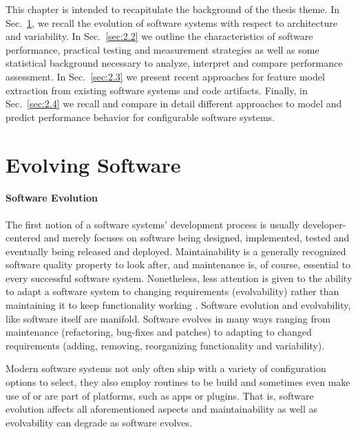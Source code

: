 This chapter is intended to recapitulate the background of the thesis theme. In
Sec.~\ref{sec:2.1}, we recall the evolution of software systems with respect to
architecture and variability. In Sec.~\ref{sec:2.2} we outline the characteristics
of software performance, practical testing and measurement strategies as well as
some statistical background necessary to analyze, interpret and compare
performance assessment. In Sec.~\ref{sec:2.3} we present recent approaches for
feature model extraction from existing software systems and code artifacts. Finally, in
Sec.~\ref{sec:2.4} we recall and compare in detail different approaches to model
and predict performance behavior for configurable software systems.




\section{Evolving Software} \label{sec:2.1}
\paragraph{Software Evolution}
The first notion of a software systems' development process is usually
developer-centered and merely focuses on software being designed, implemented,
tested and eventually being released and deployed. Maintainability is a
generally recognized software quality property to look after, and maintenance
is, of course, essential to every successful software system. Nonetheless, less
attention is given to the ability to adapt a software system to changing
requirements (evolvability) rather than maintaining it to keep functionality
working \citep{parnas_software_1994}. Software evolution and evolvability, like
software itself are manifold. Software evolves in many ways ranging from maintenance (refactoring,
bug-fixes and patches) to adapting to changed requirements (adding, removing,
reorganizing functionality and variability).

Modern software systems not only often ship with a variety of configuration
options to select, they also employ routines to be build and sometimes even
make use of or are part of platforms, such as apps or plugins. That is,
software evolution affects all aforementioned aspects and maintainability as
well as evolvability can degrade as software evolves.

